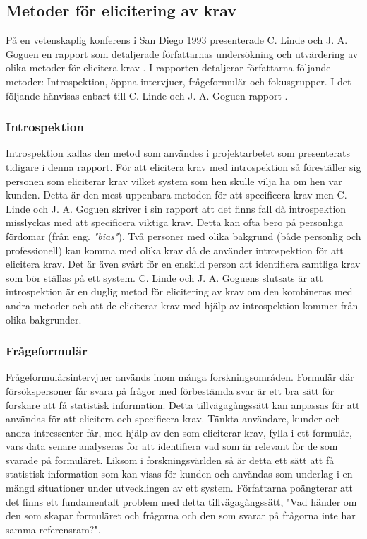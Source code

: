 \subsection{Metoder för elicitering av krav}
På en vetenskaplig konferens i San Diego 1993 presenterade C. Linde och J. A. Goguen en rapport som detaljerade författarnas undersökning och utvärdering av olika metoder för elicitera krav \cite{goguen1993techniques}. I rapporten detaljerar författarna följande metoder: Introspektion, öppna intervjuer, frågeformulär och fokusgrupper. I det följande hänvisas enbart till C. Linde och J. A. Goguen rapport \cite{goguen1993techniques}. 

\subsubsection{Introspektion}
Introspektion kallas den metod som användes i projektarbetet som presenterats tidigare i denna rapport. För att elicitera krav med introspektion så föreställer sig personen som eliciterar krav vilket system som hen skulle vilja ha om hen var kunden. Detta är den mest uppenbara metoden för att specificera krav men  C. Linde och J. A. Goguen skriver i sin rapport att det finns fall då introspektion misslyckas med att specificera viktiga krav. Detta kan ofta bero på personliga fördomar (från eng. \textit{"bias"}). Två personer med olika bakgrund (både personlig och professionell) kan komma med olika krav då de använder introspektion för att elicitera krav. Det är även svårt för en enskild person att identifiera samtliga krav som bör ställas på ett system.  C. Linde och J. A. Goguens slutsats är att introspektion är en duglig metod för elicitering av krav om den kombineras med andra metoder och att de eliciterar krav med hjälp av introspektion kommer från olika bakgrunder. 

\subsubsection{Frågeformulär}
Frågeformulärsintervjuer används inom många forskningsområden. Formulär där försökspersoner får svara på frågor med förbestämda svar är ett bra sätt för forskare att få statistisk information. Detta tillvägagångssätt kan anpassas för att användas för att elicitera och specificera krav. Tänkta användare, kunder och andra intressenter får, med hjälp av den som eliciterar krav, fylla i ett formulär, vars data senare analyseras för att identifiera vad som är relevant för de som svarade på formuläret. Liksom i forskningsvärlden så är detta ett sätt att få statistisk information som kan visas för kunden och användas som underlag i en mängd situationer under utvecklingen av ett system. Författarna poängterar att det finns ett fundamentalt problem med detta tillvägagångssätt, "Vad händer om den som skapar formuläret och frågorna och den som svarar på frågorna inte har samma referensram?".
 
